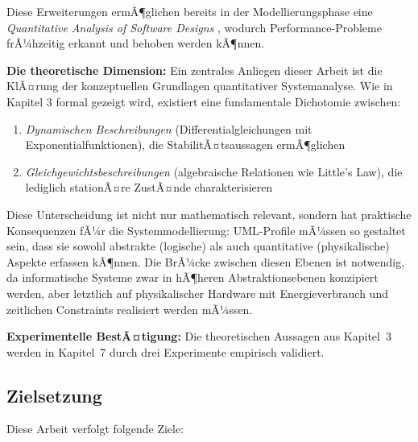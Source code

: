 ﻿\documentclass[a4paper,12pt]{scrreprt}
\theoremstyle{definition}
\begin{document}
Diese Erweiterungen ermÃ¶glichen bereits in der Modellierungsphase eine \textit{Quantitative Analysis of Software Designs} \cite{smith1990}, wodurch Performance-Probleme frÃ¼hzeitig erkannt und behoben werden kÃ¶nnen.

\textbf{Die theoretische Dimension:} Ein zentrales Anliegen dieser Arbeit ist die KlÃ¤rung der konzeptuellen Grundlagen quantitativer Systemanalyse. Wie in Kapitel 3 formal gezeigt wird, existiert eine fundamentale Dichotomie zwischen:

\begin{enumerate}
	\item[-] \textit{Dynamischen Beschreibungen} (Differentialgleichungen mit Exponentialfunktionen), die StabilitÃ¤tsaussagen ermÃ¶glichen
	\item[-] \textit{Gleichgewichtsbeschreibungen} (algebraische Relationen wie Little's Law), die lediglich stationÃ¤re ZustÃ¤nde charakterisieren
\end{enumerate}

Diese Unterscheidung ist nicht nur mathematisch relevant, sondern hat praktische Konsequenzen fÃ¼r die Systemmodellierung: UML-Profile mÃ¼ssen so gestaltet sein, dass sie sowohl abstrakte (logische) als auch quantitative (physikalische) Aspekte erfassen kÃ¶nnen. Die BrÃ¼cke zwischen diesen Ebenen ist notwendig, da informatische Systeme zwar in hÃ¶heren Abstraktionsebenen konzipiert werden, aber letztlich auf physikalischer Hardware mit Energieverbrauch und zeitlichen Constraints realisiert werden mÃ¼ssen.

\textbf{Experimentelle BestÃ¤tigung:} Die theoretischen Aussagen aus
Kapitel~3 werden in Kapitel~7 durch drei Experimente empirisch validiert.

\subsection{Zielsetzung}

Diese Arbeit verfolgt folgende Ziele:
\end{document}
